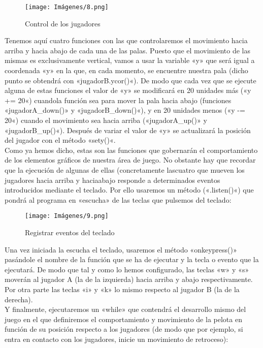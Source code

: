 \documentclass[journal]{IEEEtran}
\begin{document}
\begin{figure}[ht]
    \centering
    \texttt{[image: Imágenes/8.png]}
    \caption{Control de los jugadores}
    \label{fig:my_label}
\end{figure}

Tenemos aquí cuatro funciones con las que controlaremos el movimiento hacia arriba y hacia abajo de cada una de las palas. Puesto que el movimiento de las mismas es exclusivamente vertical, vamos a usar la variable «y» que será igual a coordenada «y» en la que, en cada momento, se encuentre nuestra pala (dicho punto se obtendrá con «jugadorB.ycor()«). De modo que cada vez que se ejecute alguna de estas funciones el valor de «y» se modificará en 20 unidades más («y += 20«) cuandola función sea para mover la pala hacia abajo (funciones «jugadorA\_down()» y «jugadorB\_down()«), y en 20 unidades menos («y -= 20«) cuando el movimiento sea hacia arriba («jugadorA\_up()» y «jugadorB\_up()«). Después de variar el valor de «y» se actualizará la posición del jugador con el método «sety()«.\\

Como ya hemos dicho, estas son las funciones que gobernarán el comportamiento de los elementos gráficos de nuestra área de juego. No obstante hay que recordar que la ejecución de algunas de ellas (concretamente lascuatro que mueven los jugadores hacia arriba y haciaabajo responde a determinados eventos introducidos mediante el teclado. Por ello usaremos un método («.listen()«) que pondrá al programa en «escucha» de las teclas que pulsemos del teclado:

\begin{figure}[ht]
    \centering
    \texttt{[image: Imágenes/9.png]}
    \caption{Registrar eventos del teclado}
    \label{fig:my_label}
\end{figure}

Una vez iniciada la escucha el teclado, usaremos el método «onkeypress()» pasándole el nombre de la función que se ha de ejecutar y la tecla o evento que la ejecutará. De modo que tal y como lo hemos configurado, las teclas «w» y «s» moverán al jugador A (la de la izquierda) hacia arriba y abajo respectivamente. Por otra parte las teclas «i» y «k» lo mismo respecto al jugador B (la de la derecha).\\

Y finalmente, ejecutaremos un «while» que contendrá el desarrollo mismo del juego en el que definiremos el comportamiento y movimiento de la pelota en función de su posición respecto a los jugadores (de modo que por ejemplo, si entra en contacto con los jugadores, inicie un movimiento de retroceso):
\end{document}
